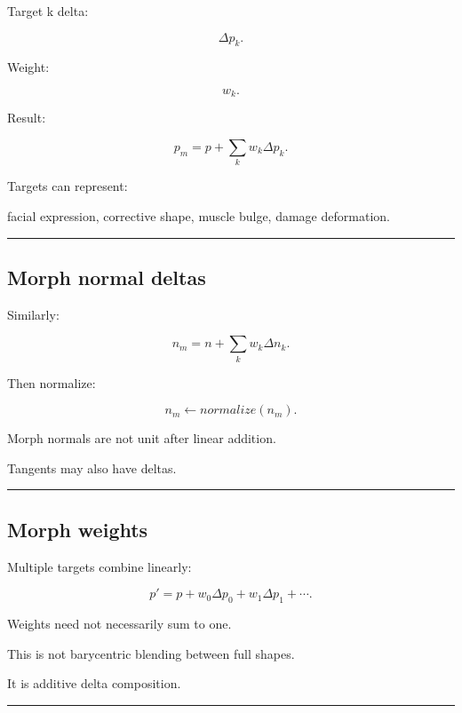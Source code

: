 Target k delta:

\[
\Delta p_k.
\]

Weight:

\[
w_k.
\]

Result:

\[
\boxed{
p_m
=
p+
\sum_kw_k\Delta p_k.
}
\]

Targets can represent:

facial expression, corrective shape, muscle bulge, damage deformation.

\begin{center}\rule{0.5\linewidth}{0.5pt}\end{center}

\subsection{Morph normal deltas}\label{04-visual-computing-ii-ch041-morph-normal-deltas}

\hypertarget{04-visual-computing-ii-ch041-morph-normal-deltas}{}

Similarly:

\[
n_m=
n+
\sum_kw_k\Delta n_k.
\]

Then normalize:

\[
\boxed{
n_m\leftarrow
normalize(n_m).
}
\]

Morph normals are not unit after linear addition.

Tangents may also have deltas.

\begin{center}\rule{0.5\linewidth}{0.5pt}\end{center}

\subsection{Morph weights}\label{04-visual-computing-ii-ch041-morph-weights}

\hypertarget{04-visual-computing-ii-ch041-morph-weights}{}

Multiple targets combine linearly:

\[
p'
=
p+
w_0\Delta p_0
+
w_1\Delta p_1
+\cdots.
\]

Weights need not necessarily sum to one.

This is not barycentric blending between full shapes.

It is additive delta composition.

\begin{center}\rule{0.5\linewidth}{0.5pt}\end{center}

